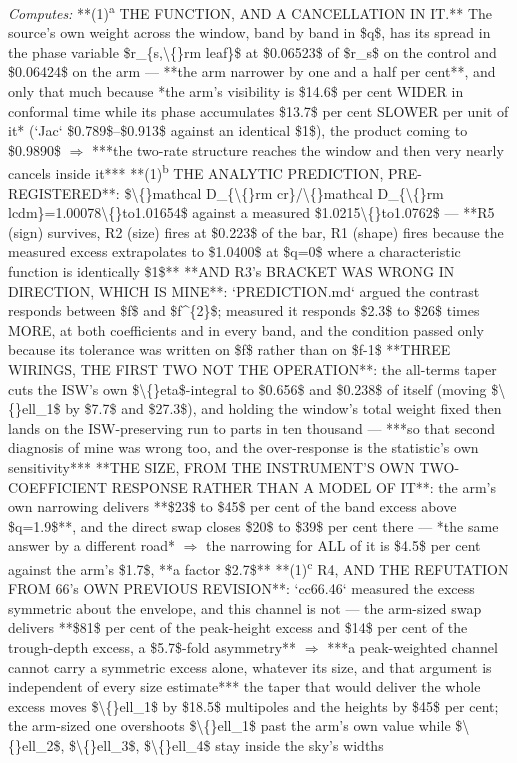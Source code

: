 \begin{description}
\emph{Computes:} **(1)\textsuperscript{a} THE FUNCTION, AND A CANCELLATION IN IT.** The source's own weight across the window, band by band in \$q\$, has its spread in the phase variable \$r\_\{s,\textbackslash\{\}rm leaf\}\$ at \$0.06523\$ of \$r\_s\$ on the control and \$0.06424\$ on the arm --- **the arm narrower by one and a half per cent**, and only that much because *the arm's visibility is \$14.6\$ per cent WIDER in conformal time while its phase accumulates \$13.7\$ per cent SLOWER per unit of it* (`Jac` \$0.789\$--\$0.913\$ against an identical \$1\$), the product coming to \$0.9890\$ \ensuremath{\Rightarrow} ***the two-rate structure reaches the window and then very nearly cancels inside it***  **(1)\textsuperscript{b} THE ANALYTIC PREDICTION, PRE-REGISTERED**: \$\textbackslash\{\}mathcal D\_\{\textbackslash\{\}rm cr\}/\textbackslash\{\}mathcal D\_\{\textbackslash\{\}rm lcdm\}=1.00078\textbackslash\{\}to1.01654\$ against a measured \$1.0215\textbackslash\{\}to1.0762\$ --- **R5 (sign) survives, R2 (size) fires at \$0.223\$ of the bar, R1 (shape) fires because the measured excess extrapolates to \$1.0400\$ at \$q=0\$ where a characteristic function is identically \$1\$**   **AND R3's BRACKET WAS WRONG IN DIRECTION, WHICH IS MINE**: `PREDICTION.md` argued the contrast responds between \$f\$ and \$f\textasciicircum{}\{2\}\$; measured it responds \$2.3\$ to \$26\$ times MORE, at both coefficients and in every band, and the condition passed only because its tolerance was written on \$f\$ rather than on \$f-1\$  **THREE WIRINGS, THE FIRST TWO NOT THE OPERATION**: the all-terms taper cuts the ISW's own \$\textbackslash\{\}eta\$-integral to \$0.656\$ and \$0.238\$ of itself (moving \$\textbackslash\{\}ell\_1\$ by \$7.7\$ and \$27.3\$), and holding the window's total weight fixed then lands on the ISW-preserving run to parts in ten thousand --- ***so that second diagnosis of mine was wrong too, and the over-response is the statistic's own sensitivity***   **THE SIZE, FROM THE INSTRUMENT'S OWN TWO-COEFFICIENT RESPONSE RATHER THAN A MODEL OF IT**: the arm's own narrowing delivers **\$23\$ to \$45\$ per cent of the band excess above \$q=1.9\$**, and the direct swap closes \$20\$ to \$39\$ per cent there --- *the same answer by a different road* \ensuremath{\Rightarrow} the narrowing for ALL of it is \$4.5\$ per cent against the arm's \$1.7\$, **a factor \$2.7\$**   **(1)\textsuperscript{c} R4, AND THE REFUTATION FROM 66's OWN PREVIOUS REVISION**: `cc66.46` measured the excess symmetric about the envelope, and this channel is not --- the arm-sized swap delivers **\$81\$ per cent of the peak-height excess and \$14\$ per cent of the trough-depth excess, a \$5.7\$-fold asymmetry** \ensuremath{\Rightarrow} ***a peak-weighted channel cannot carry a symmetric excess alone, whatever its size, and that argument is independent of every size estimate***  the taper that would deliver the whole excess moves \$\textbackslash\{\}ell\_1\$ by \$18.5\$ multipoles and the heights by \$45\$ per cent; the arm-sized one overshoots \$\textbackslash\{\}ell\_1\$ past the arm's own value while \$\textbackslash\{\}ell\_2\$, \$\textbackslash\{\}ell\_3\$, \$\textbackslash\{\}ell\_4\$ stay inside the sky's widths

\end{description}
